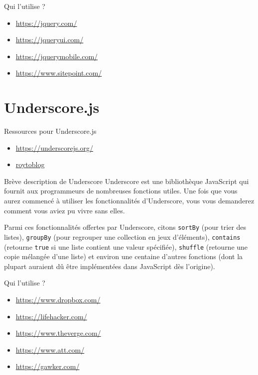 \documentclass[presentation]{beamer}
\begin{document}
\begin{frame}[label={sec:org195793a}]{Qui l'utilise ?}
\begin{itemize}
\item \url{https://jquery.com/}
\item \url{https://jqueryui.com/}
\item \url{https://jquerymobile.com/}
\item \url{https://www.sitepoint.com/}
\end{itemize}
\end{frame}


\section{Underscore.js}
\label{sec:orgcfdfbb6}
\begin{frame}[label={sec:orgf98c28a}]{Ressources pour Underscore.js}
\begin{itemize}
\item \url{https://underscorejs.org/}
\item \href{http://royto.familleroy.fr/2013/10/08/presentation-de-underscore-js/}{roytoblog}
\end{itemize}
\end{frame}

\begin{frame}[fragile,label={sec:org81f8650}]{Brève description de Underscore}
 Underscore est une bibliothèque JavaScript qui fournit aux
programmeurs de nombreuses fonctions utiles. Une fois que vous aurez
commencé à utiliser les fonctionnalités d'Underscore, vous vous
demanderez comment vous aviez pu vivre sans elles.

Parmi ces fonctionnalités offertes par Underscore, citons \texttt{sortBy}
(pour trier des listes), \texttt{groupBy} (pour regrouper une collection en
jeux d'éléments), \texttt{contains} (retourne \texttt{true} si une liste contient
une valeur spécifiée), \texttt{shuffle} (retourne une copie mélangée d'une
liste) et environ une centaine d'autres fonctions (dont la plupart
auraient dû être implémentées dans JavaScript dès l'origine).
\end{frame}

\begin{frame}[label={sec:org3717dd8}]{Qui l'utilise ?}
\begin{itemize}
\item \url{https://www.dropbox.com/}
\item \url{https://lifehacker.com/}
\item \url{https://www.theverge.com/}
\item \url{https://www.att.com/}
\item \url{https://gawker.com/}
\end{itemize}
\end{frame}
\end{document}
